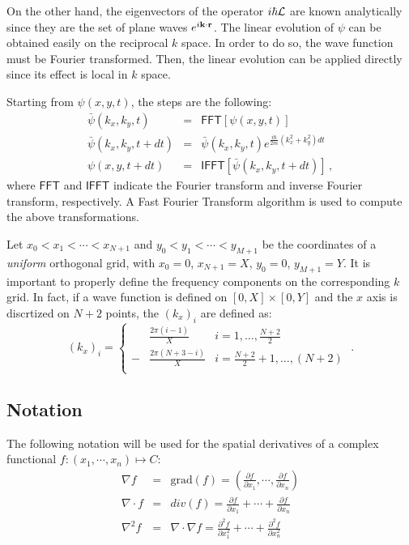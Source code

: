 \documentclass[a4paper,11pt]{article}
\begin{document}
On the other hand, the eigenvectors of the operator $i\hbar{\cal L}$ are known
analytically since they are the set of plane waves $e^{i {\bf k}\cdot{\bf r}}$.
The linear evolution of $\psi$
can be obtained easily on the reciprocal $k$ space.
In order to do so, the wave function must be Fourier transformed. Then, the
linear evolution can be applied directly since its effect is local in $k$ space.

Starting from $\psi(x,y,t)$, the steps are the following:
\begin{eqnarray}
 \bar{\psi}(k_x,k_y,t) &=& \mathsf{FFT}[\psi(x,y,t)] \\
 \bar{\psi}(k_x,k_y,t+dt) &=& \bar{\psi}(k_x,k_y,t)
 e^{\frac{i\hbar}{2m} (k_x^2+k_y^2)dt} \label{klinearevolution} \\
 \psi(x,y,t+dt) &=& \mathsf{IFFT}[\bar{\psi}(k_x,k_y,t+dt)] \, ,
\end{eqnarray}
where $\mathsf{FFT}$ and $\mathsf{IFFT}$ indicate the Fourier transform and inverse Fourier transform,
respectively. A Fast Fourier Transform algorithm is used to compute the above transformations.

Let $ x_0 < x_1 < \cdots < x_{N+1} $ and $ y_0 < y_1 < \cdots < y_{M+1} $ be the coordinates of a
\emph{uniform} orthogonal grid, with $x_0=0$, $x_{N+1}=X$, $y_0=0$, $y_{M+1}=Y$.
It is important to properly define the frequency components on the corresponding $k$ grid.
In fact, if a wave function is defined on $[0, X]\times[0,Y]$ and
the $x$ axis is discrtized on $N+2$ points,
the $(k_x)_i$ are defined as:
\begin{equation}
(k_x)_i = \left\{ 
         \begin{array}{rll}
         &\frac{2 \pi (i-1)}{X} & i = 1, \ldots, \frac{N + 2}{2} \\
         -&\frac{2 \pi (N+3-i)}{X} & i = \frac{N+2}{2}+1, \ldots, (N + 2) \\
         \end{array} \right. \; .
\end{equation}

\newpage

\begin{appendices}
\section{Notation}

The following notation will be used for the spatial derivatives of a complex functional
$f:(x_1,\cdots, x_n)\mapsto C$:
\begin{eqnarray}
\nabla f &=& \mbox{grad}(f) =
\left( \frac{\partial f}{\partial x_1}, \cdots, \frac{\partial f}{\partial x_n} \right) \\
\nabla \cdot f &=& div(f) = \frac{\partial f}{\partial x_1} + \cdots + \frac{\partial f}{\partial x_n} \\
\nabla^2 f &=& \nabla \cdot \nabla f =
    \frac{\partial^2 f}{\partial x_1^2} + \cdots + \frac{\partial^2 f}{\partial x_n^2}
\end{eqnarray}

\end{appendices}
\end{document}
